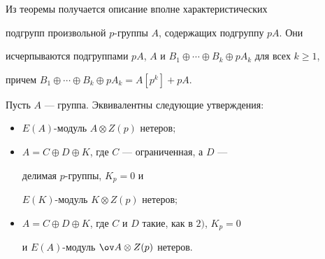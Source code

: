  


Из теоремы получается описание вполне характеристических 


подгрупп произвольной $p$-группы $A$, содержащих подгруппу $pA$. Они 


исчерпываются подгруппами $pA$, $A$ и $B_1\oplus\dotsb\oplus B_k\oplus 


pA_k$ для всех $k\ge1$, 


причем $B_1\oplus\dotsb\oplus B_k\oplus pA_k=A[p^k]+pA$. 


 


\begin{thms} 


Пусть $A$ --- группа. Эквивалентны следующие утверждения$:$ 


\begin{itemize} 


\item[1)] $E(A)$-модуль $A\otimes Z(p)$ нетеров$;$ 


\item[2)] $A=C\oplus D\oplus K$, где $C$ --- ограниченная, а $D$ --- 


делимая $p$-группы, $K_p=0$ и 


$E(K)$-модуль $K\otimes Z(p)$ нетеров$;$ 


\item[3)] $A=C\oplus D\oplus K$, где $C$ и $D$ такие, как в $2)$, $K_p=0$ 


и $E(A)$-модуль $\ov A\otimes Z(p)$ нетеров. 


\end{itemize} 


\end{thms} 


 


